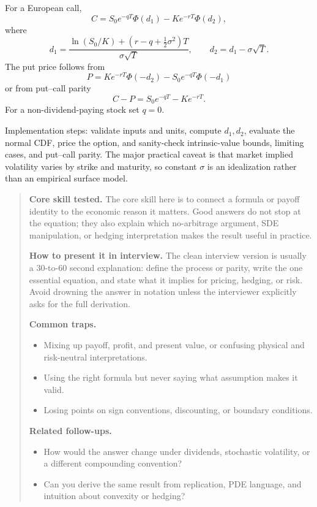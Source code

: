 \documentclass[11pt,letterpaper,openany]{book}
\newenvironment{EditorialNote}
  {\begin{quote}\small\setlength{\parskip}{0.25em}}
  {\end{quote}}
\newcommand{\QuestionSpacer}{\vspace{0.4em}}
\begin{document}
For a European call,
\[
C=S_0e^{-qT}\Phi(d_1)-Ke^{-rT}\Phi(d_2),
\]
where
\[
d_1=\frac{\ln(S_0/K)+(r-q+\tfrac12\sigma^2)T}{\sigma\sqrt T},
\qquad
d_2=d_1-\sigma\sqrt T.
\]
The put price follows from
\[
P=Ke^{-rT}\Phi(-d_2)-S_0e^{-qT}\Phi(-d_1)
\]
or from put--call parity
\[
C-P=S_0e^{-qT}-Ke^{-rT}.
\]
For a non-dividend-paying stock set \(q=0\).

Implementation steps: validate inputs and units, compute \(d_1,d_2\), evaluate the normal CDF, price the option, and sanity-check intrinsic-value bounds, limiting cases, and put--call parity. The major practical caveat is that market implied volatility varies by strike and maturity, so constant \(\sigma\) is an idealization rather than an empirical surface model.

\begin{EditorialNote}


\textbf{Core skill tested.} The core skill here is to connect a formula or payoff identity to the economic reason it matters. Good answers do not stop at the equation; they also explain which no-arbitrage argument, SDE manipulation, or hedging interpretation makes the result useful in practice.

\textbf{How to present it in interview.} The clean interview version is usually a 30-to-60 second explanation: define the process or parity, write the one essential equation, and state what it implies for pricing, hedging, or risk. Avoid drowning the answer in notation unless the interviewer explicitly asks for the full derivation.

\textbf{Common traps.}
\begin{itemize}
\item Mixing up payoff, profit, and present value, or confusing physical and risk-neutral interpretations.
\item Using the right formula but never saying what assumption makes it valid.
\item Losing points on sign conventions, discounting, or boundary conditions.
\end{itemize}

\textbf{Related follow-ups.}
\begin{itemize}
\item How would the answer change under dividends, stochastic volatility, or a different compounding convention?
\item Can you derive the same result from replication, PDE language, and intuition about convexity or hedging?
\end{itemize}


\end{EditorialNote}
\QuestionSpacer
\end{document}
